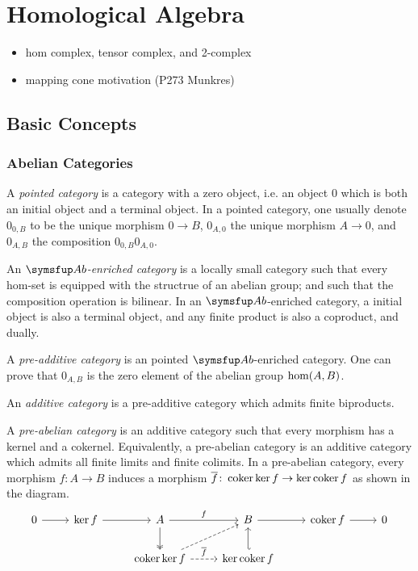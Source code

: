 
\chapter{Homological Algebra}

\begin{itemize}\color{red}
  \item hom complex, tensor complex, and 2-complex
  \item mapping cone motivation (P273 Munkres)
\end{itemize}

\section{Basic Concepts}

\subsection{Abelian Categories}

A \emph{pointed category} is a category with a zero object, i.e. an object 0 which is both an initial object and a terminal object. In a pointed category, one usually denote $0_{0, B}$ to be the unique morphism $0\to B$, $0_{A, 0}$ the unique morphism $A\to 0$, and $0_{A, B}$ the composition $0_{0, B}0_{A, 0}$.

An \emph{$\AB$-enriched category} is a locally small category such that every hom-set is equipped with the structrue of an abelian group; and such that the composition operation is bilinear. In an $\AB$-enriched category, a initial object is also a terminal object, and any finite product is also a coproduct, and dually.

A \emph{pre-additive category} is an pointed $\AB$-enriched category. One can prove that $0_{A,B}$ is the zero element of the abelian group $\operatorname{hom}(A, B)$.

An \emph{additive category} is a pre-additive category which admits finite biproducts.

A \emph{pre-abelian category} is an additive category such that every morphism has a kernel and a cokernel. Equivalently, a pre-abelian category is an additive category which admits all finite limits and finite colimits. In a pre-abelian category, every morphism $f\colon A\to B$ induces a morphism $\overline{f}\colon\operatorname{coker}\operatorname{ker} f\to \operatorname{ker}\operatorname{coker} f$ as shown in the diagram.
\begin{equation*}
  \begin{tikzcd}
    0 & \KER f & A & B & \COKER f & 0\\
    & & \COKER\KER f & \KER\COKER f
    \arrow[from=1-1,]{1-2}[]{}
    \arrow[from=1-2,]{1-3}[]{}
    \arrow[from=1-3,]{1-4}[]{f}
    \arrow[from=1-4,]{1-5}[]{}
    \arrow[from=1-5,]{1-6}[]{}
    \arrow[from=1-3,two heads,]{2-3}[]{}
    \arrow[from=1-4,hookleftarrow,]{2-4}[]{}
    \arrow[from=2-3,dashed,]{1-4}[]{}
    \arrow[from=2-3,dashed,]{2-4}[]{\overline{f}}
  \end{tikzcd}
\end{equation*}

